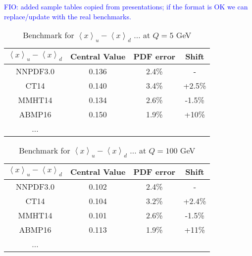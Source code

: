 \textcolor{blue}{FIO: added sample tables copied from presentations; 
if the format is OK we can replace/update with the real benchmarks. }

\begin{table}[t]
\centering
\begin{tabular}{|c||c|c|c|}
\hline 
\rule[-3 ex]{0pt}{7 ex}  %
$\left\langle x\right\rangle _{u}-\left\langle x\right\rangle _{d}$ 
   & Central Value & PDF error & Shift\\
\hline 
\hline 
NNPDF3.0 & 0.136 & 2.4\% & -\\
\hline 
CT14 & 0.140 & 3.4\% & +2.5\%\\
\hline 
MMHT14 & 0.134 & 2.6\% & -1.5\%\\
\hline 
ABMP16 & 0.150 & 1.9\% & +10\%\\
\hline 
... &  &  & \\
\hline 
\end{tabular}

\caption{Benchmark for $\left\langle x\right\rangle _{u}-\left\langle x\right\rangle _{d}$
... at $Q=5$ GeV}

\end{table}


\begin{table}[t]
\centering
\begin{tabular}{|c||c|c|c|}
\hline 
\rule[-3 ex]{0pt}{7 ex}  %
$\left\langle x\right\rangle _{u}-\left\langle x\right\rangle _{d}$ 
   & Central Value & PDF error & Shift\\
\hline 
\hline 
NNPDF3.0 & 0.102 & 2.4\% & -\\
\hline 
CT14 & 0.104 & 3.2\% & +2.4\%\\
\hline 
MMHT14 & 0.101 & 2.6\% & -1.5\%\\
\hline 
ABMP16 & 0.113 & 1.9\% & +11\%\\
\hline 
... &  &  & \\
\hline 
\end{tabular}

\caption{Benchmark for $\left\langle x\right\rangle _{u}-\left\langle x\right\rangle _{d}$
... at $Q=100$ GeV}
\end{table}

